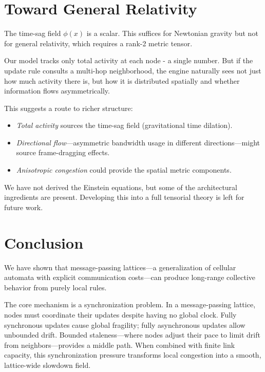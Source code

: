 \documentclass[aps, pra, reprint, superscriptaddress, nofootinbib, singlespacing]{revtex4-2}
\begin{document}
\section{Toward General Relativity}
\label{sec:extensions}

The time-sag field $\phi(x)$ is a scalar. This suffices for Newtonian gravity but not for general relativity, which requires a rank-2 metric tensor.

Our model tracks only total activity at each node - a single number. But if the update rule consults a multi-hop neighborhood, the engine naturally sees not just how much activity there is, but how it is distributed spatially and whether information flows asymmetrically.

This suggests a route to richer structure:
\begin{itemize}
    \item \emph{Total activity} sources the time-sag field (gravitational time dilation).
    \item \emph{Directional flow}—asymmetric bandwidth usage in different directions—might source frame-dragging effects.
    \item \emph{Anisotropic congestion} could provide the spatial metric components.
\end{itemize}

We have not derived the Einstein equations, but some of the architectural ingredients are present. Developing this into a full tensorial theory is left for future work.


\section{Conclusion}
\label{sec:conclusion}

We have shown that message-passing lattices—a generalization of cellular automata with explicit communication costs—can produce long-range collective behavior from purely local rules.

The core mechanism is a synchronization problem. In a message-passing lattice, nodes must coordinate their updates despite having no global clock. Fully synchronous updates cause global fragility; fully asynchronous updates allow unbounded drift. Bounded staleness—where nodes adjust their pace to limit drift from neighbors—provides a middle path. When combined with finite link capacity, this synchronization pressure transforms local congestion into a smooth, lattice-wide slowdown field.
\end{document}
